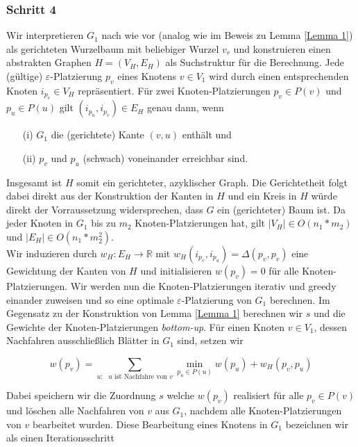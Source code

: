 \documentclass[a4paper, 12pt, twoside]{article}
\theoremstyle{Format1} %
\begin{document}
\subsubsection{Schritt 4}
Wir interpretieren $G_1$ nach wie vor (analog wie im Beweis zu Lemma \ref{Lemma 1}) als gerichteten Wurzelbaum  mit beliebiger Wurzel $v_r$ und
konstruieren einen abstrakten Graphen $H = (V_H, E_H)$ als Suchstruktur für die Berechnung.
Jede (gültige) $\varepsilon$-Platzierung $p_v$ eines Knotens $v \in V_1$ wird durch einen entsprechenden Knoten $i_{p_v} \in V_H$ repräsentiert.
Für zwei Knoten-Platzierungen $p_v \in P(v)$ und $p_u \in P(u)$ gilt $(i_{p_u},i_{p_v}) \in E_H$ genau dann, wenn

\begin{enumerate}
	\item[(i)] $G_1$ die (gerichtete) Kante $(v,u)$ enthält und
	\item[(ii)] $p_v$ und $p_u$ (schwach) voneinander erreichbar sind.
\end{enumerate}

Insgesamt ist $H$ somit ein gerichteter, azyklischer Graph. Die Gerichtetheit folgt dabei direkt aus der Konstruktion der Kanten in $H$ und
ein Kreis in $H$ würde direkt der Vorraussetzung widersprechen, dass $G$ ein (gerichteter) Baum ist.
Da jeder Knoten in $G_1$ bis zu $m_2$ Knoten-Platzierungen hat, gilt $|V_H| \in O(n_1*m_2)$ und $|E_H| \in O(n_1*m_2^2)$.
\\
Wir induzieren durch $w_H: E_H \to \mathbb{R}$ mit $w_H(i_{p_v},i_{p_u}) = \Delta(p_v,p_v)$ eine Gewichtung der Kanten von $H$ und
initialisieren $w(p_v) = 0$ für alle Knoten-Platzierungen.
Wir werden nun die Knoten-Platzierungen iterativ und greedy einander zuweisen und so eine optimale $\varepsilon$-Platzierung von $G_1$ berechnen.
Im Gegensatz zu der Konstruktion von Lemma \ref{Lemma 1} berechnen wir $s$ und die Gewichte der Knoten-Platzierungen \textit{bottom-up}.
Für einen Knoten $v \in V_1$, dessen Nachfahren ausschließlich Blätter in $G_1$ sind, setzen wir

\begin{equation}
	w(p_v) = \sum_{\text{$u:$ $u$ ist Nachfahre von $v$}} \min_{p_u \in P(u)} w(p_u) + w_H(p_v,p_u) \label{optimal placements}
\end{equation}

Dabei speichern wir die Zuordnung $s$ welche $w(p_v)$ realisiert für alle $p_v \in P(v)$ und löschen alle Nachfahren von $v$ aus $G_1$,
nachdem alle Knoten-Platzierungen von $v$ bearbeitet wurden.
Diese Bearbeitung eines Knotens in $G_1$ bezeichnen wir als einen Iterationsschritt \label{Iterationsschritt}
\end{document}
